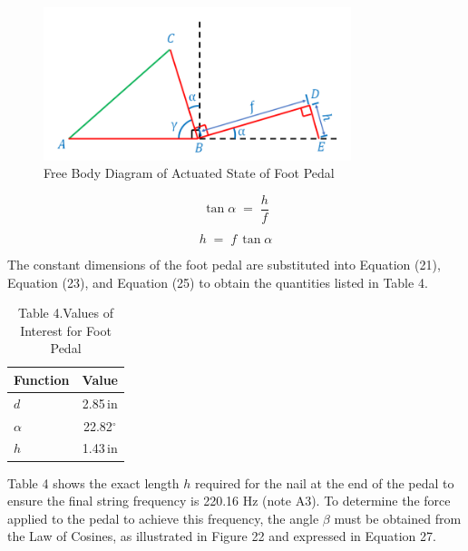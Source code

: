 \documentclass[12pt]{article}
\theoremstyle{definition} %
\theoremstyle{plain} %
\begin{document}
\begin{figure}[htbp]
  \centering
  \includegraphics[width=0.8\textwidth]{classes/Mathematics-of-Guitar-Strings/06-10/fgs/fig21.png}
  \caption{Free Body Diagram of Actuated State of Foot Pedal}
  \label{fig:}
\end{figure}

\begin{equation}
  \tan\alpha \;=\; \frac{h}{f}
  \tag{24}
\end{equation}

\begin{equation}
  h \;=\; f\,\tan\alpha
  \tag{25}
\end{equation}

The constant dimensions of the foot pedal are substituted into
Equation (21), Equation (23), and Equation (25) to obtain the
quantities listed in Table 4.

\begin{table}[ht]
\centering
\caption*{Table 4.\;Values of Interest for Foot Pedal}
\begin{tabular}{|l|c|}
\hline
\textbf{Function} & \textbf{Value} \\ \hline
$d$   & 2.85\,in \\ \hline
$\alpha$ & 22.82$^\circ$ \\ \hline
$h$   & 1.43\,in \\ \hline
\end{tabular}
\end{table}

Table 4 shows the exact length $h$ required for the nail at the end of the
pedal to ensure the final string frequency is 220.16 Hz (note A3).
To determine the force applied to the pedal to achieve this frequency,
the angle $\beta$ must be obtained from the Law of Cosines, as illustrated
in Figure 22 and expressed in Equation 27.
\end{document}
